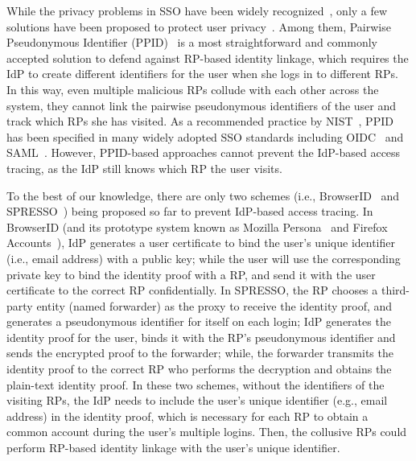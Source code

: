 While the privacy problems in SSO have been widely recognized~\cite{maler2008venn,NIST2017draft}, only a few solutions have been proposed to protect user privacy~\cite{persona,SPRESSO}. Among them, Pairwise Pseudonymous Identifier (PPID)~\cite{OpenIDConnect, SAMLIdentifier} is a most straightforward and commonly accepted solution to defend against RP-based identity linkage, which requires the IdP to create different identifiers for the user when she logs in to different RPs. In this way, even multiple malicious RPs collude with each other across the system, they cannot link the  pairwise pseudonymous identifiers of the user and track which RPs she has visited. As a recommended practice by NIST~\cite{NIST2017draft}, PPID has been specified in many widely adopted SSO standards including OIDC~\cite{OpenIDConnect} and SAML~\cite{SAMLIdentifier}.
However, PPID-based approaches cannot prevent the IdP-based access tracing, as the IdP still knows which RP the user visits. %

To the best of our knowledge, there are only two schemes (i.e., BrowserID~\cite{BrowserID} and SPRESSO~\cite{SPRESSO}) being proposed so far to prevent IdP-based access tracing.
In BrowserID (and its prototype system known as Mozilla Persona~\cite{persona} and Firefox Accounts~\cite{FirefoxAccount}),
 IdP generates a user certificate to bind the user's unique identifier (i.e., email address) with a public key;
 while the user will use the corresponding private key to bind the identity proof with a RP, and send it with the user certificate to the correct RP confidentially.
In SPRESSO, the RP chooses a third-party entity (named forwarder) as the proxy to receive the identity proof,
 and generates a pseudonymous identifier for itself on each login;
 IdP generates the identity proof for the user,  binds it with the RP's pseudonymous identifier and sends the encrypted proof to the forwarder;
 while, the forwarder transmits the identity proof to the correct RP who performs the decryption and obtains the plain-text identity proof.
In these two schemes, without the identifiers of the visiting RPs,
the IdP needs to include the user's unique identifier (e.g., email address) in the identity proof,
 which is necessary for  each RP to  obtain a common account during the user's multiple logins.
Then, the collusive RPs could  perform RP-based identity linkage with the user's unique identifier.


